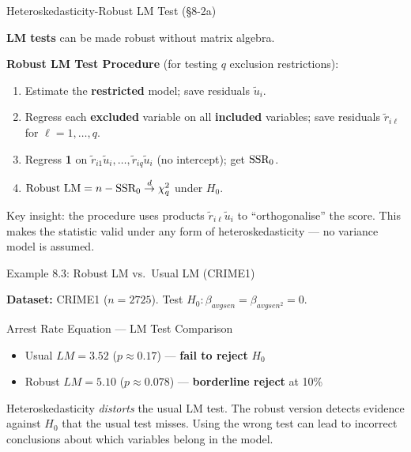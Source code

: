 \documentclass[aspectratio=169, 12pt]{beamer}
\begin{document}
\begin{frame}{Heteroskedasticity-Robust LM Test (\S8-2a)}

  \textbf{LM tests} can be made robust without matrix algebra.

  \begin{highlightbox}
    \textbf{Robust LM Test Procedure} (for testing $q$ exclusion restrictions):
    \begin{enumerate}
      \item Estimate the \textbf{restricted} model; save residuals $\tilde{u}_i$.
      \item Regress each \textbf{excluded} variable on all \textbf{included} variables; save residuals $\tilde{r}_{i\ell}$ for $\ell = 1,\ldots,q$.
      \item Regress \textbf{1} on $\tilde{r}_{i1}\tilde{u}_i, \ldots, \tilde{r}_{iq}\tilde{u}_i$ (no intercept); get $\text{SSR}_0$.
      \item $\text{Robust LM} = n - \text{SSR}_0 \overset{d}{\to} \chi^2_q$ under $H_0$.
    \end{enumerate}
  \end{highlightbox}

  \smallskip

  \begin{keybox}
    Key insight: the procedure uses products $\tilde{r}_{i\ell}\tilde{u}_i$ to ``orthogonalise'' the score. This makes the statistic valid under any form of heteroskedasticity — no variance model is assumed.
  \end{keybox}

\end{frame}

\begin{frame}{Example 8.3: Robust LM vs.\ Usual LM (CRIME1)}

  \textbf{Dataset:} CRIME1 ($n=2725$). Test $H_0: \beta_{\textit{avgsen}} = \beta_{\textit{avgsen}^2} = 0$.

  \begin{examplebox}{Arrest Rate Equation — LM Test Comparison}
    \begin{itemize}
      \item Usual $LM = 3.52$ ($p \approx 0.17$) — \textcolor{positive}{\textbf{fail to reject}} $H_0$
      \item Robust $LM = 5.10$ ($p \approx 0.078$) — \textcolor{negative}{\textbf{borderline reject}} at 10\%
    \end{itemize}
  \end{examplebox}

  \smallskip

  \begin{keybox}
    Heteroskedasticity \textit{distorts} the usual LM test. The robust version detects evidence against $H_0$ that the usual test misses. Using the wrong test can lead to incorrect conclusions about which variables belong in the model.
  \end{keybox}

\end{frame}
\end{document}
